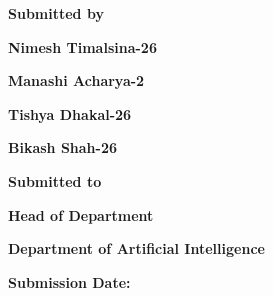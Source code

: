 \begin{titlepage}
\begin{center}
\vspace{14pt}

\vspace{14pt}
{\large \textbf{Submitted by
}\par}\vspace{8pt}    
{\large \textbf{Nimesh Timalsina-26
}\par}
{\large \textbf{Manashi Acharya-2
}\par}
{\large \textbf{Tishya Dhakal-26
}\par}
{\large \textbf{Bikash Shah-26
}\par}

\vspace{24pt}
{\large \textbf{Submitted to
}\par}\vspace{8pt}    
{\large \textbf{Head of Department
}\par}
{\large \textbf{Department of Artificial Intelligence
}\par} \vspace{8pt}  


{\large \textbf{Submission Date:
}\par}

    \vspace*{\fill}

    \end{center}
\end{titlepage}